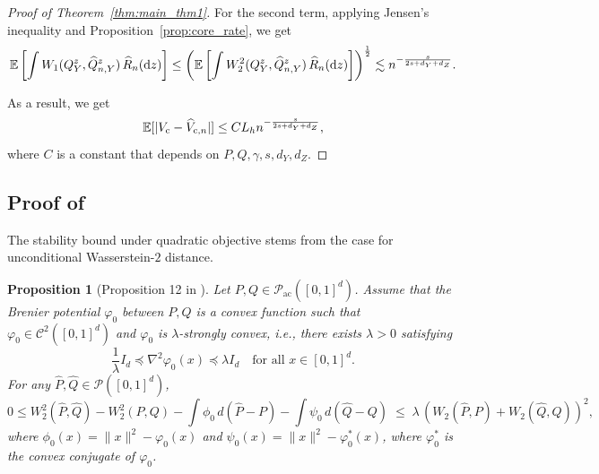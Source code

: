 \documentclass{article}
\theoremstyle{plain}
\newtheorem{proposition}{Proposition}[section]
\theoremstyle{definition}
\def\EE{\mathbb{E}}
\def\PP{P}
\def\QQ{Q}
\def\calC{\mathcal{C}}
\newcommand{\cc}{\textup{c}}
\theoremstyle{plain}
\newcommand{\diff}{{\rm d}}
\def\EE{\mathbb{E}}
\def\calC{\mathcal{C}}
\begin{document}
\begin{proof}[Proof of Theorem~\ref{thm:main_thm1}]
    For the second term, applying Jensen's inequality and Proposition~\ref{prop:core_rate}, we get
    \[
        \EE\left[\int W_1(\QQ_Y^z, \widehat \QQ_{n,Y}^z) \, \widehat R_{n}(\diff z)\right] \leq \left(\EE\left[\int W_2^2(\QQ_Y^z, \widehat \QQ_{n,Y}^z) \, \widehat R_{n}(\diff z)\right]\right)^{\frac{1}{2}} \lesssim n^{-\frac{s}{2s+d_Y + d_Z}}.
    \]

    As a result, we get
    \[
        \EE[|V_{\cc} - \widehat V_{\cc, n}|] \leq C L_h n^{-\frac{s}{2s+d_Y + d_Z}},      
    \]
    where $C$ is a constant that depends on $P, Q, \gamma, s, d_Y, d_Z$.
    
\end{proof}

\subsection{Proof of }
The stability bound under quadratic objective stems from the case for unconditional Wasserstein-$2$ distance.
\begin{proposition}[Proposition 12 in \parencite{manole2024plugin}]\label{prop:stability.OT}
Let $\PP, \QQ \in \mathcal{P}_{\mathrm{ac}}([0,1]^d)$. Assume that the Brenier potential $\varphi_0$ between $\PP, \QQ$ is a convex function such that
$\varphi_0 \in \calC^2([0,1]^d)$ and $\varphi_0$ is $\lambda$-strongly convex, i.e., there exists $\lambda > 0$ satisfying
\[
\frac{1}{\lambda} I_d \preceq \nabla^2 \varphi_0(x) \preceq \lambda I_d
\quad \text{for all } x \in [0,1]^d.
\]
For any $\widehat \PP, \widehat{\QQ} \in \mathcal{P}([0,1]^d)$,
\begin{equation}
0 \le W_2^2(\widehat \PP,\widehat{\QQ})
-
W_2^2(\PP,\QQ)
-
\int \phi_0 \, d(\widehat{\PP}-\PP)
-
\int \psi_0 \, d(\widehat{\QQ}-\QQ)
\;\le\;
\lambda\,(W_2(\widehat{\PP},\PP) + W_2(\widehat{\QQ},\QQ))^2,
\end{equation}
where $\phi_0(x) = \|x\|^2 - \varphi_0(x)$ and $\psi_0(x) = \|x\|^2 - \varphi_0^*(x)$, where $\varphi_0^*$ is the convex conjugate of $\varphi_0$.
\end{proposition}
\end{document}
